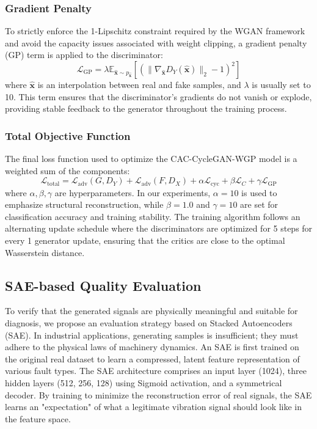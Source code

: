 \subsubsection{Gradient Penalty}
To strictly enforce the 1-Lipschitz constraint required by the WGAN framework and avoid the capacity issues associated with weight clipping, a gradient penalty (GP) term is applied to the discriminator:
\begin{equation}
\mathcal{L}_{\text{GP}} = \lambda \mathbb{E}_{\hat{\boldsymbol{x}} \sim p_{\hat{\boldsymbol{x}}}} [(\|\nabla_{\hat{\boldsymbol{x}}} D_Y(\hat{\boldsymbol{x}})\|_2 - 1)^2]
\end{equation}
where $\hat{\boldsymbol{x}}$ is an interpolation between real and fake samples, and $\lambda$ is usually set to 10. This term ensures that the discriminator's gradients do not vanish or explode, providing stable feedback to the generator throughout the training process.

\subsubsection{Total Objective Function}
The final loss function used to optimize the CAC-CycleGAN-WGP model is a weighted sum of the components:
\begin{equation}
\mathcal{L}_{\text{total}} = \mathcal{L}_{\text{adv}}(G, D_Y) + \mathcal{L}_{\text{adv}}(F, D_X) + \alpha \mathcal{L}_{\text{cyc}} + \beta \mathcal{L}_{C} + \gamma \mathcal{L}_{\text{GP}}
\end{equation}
where $\alpha, \beta, \gamma$ are hyperparameters. In our experiments, $\alpha=10$ is used to emphasize structural reconstruction, while $\beta=1.0$ and $\gamma=10$ are set for classification accuracy and training stability. The training algorithm follows an alternating update schedule where the discriminators are optimized for 5 steps for every 1 generator update, ensuring that the critics are close to the optimal Wasserstein distance.

\subsection{SAE-based Quality Evaluation}
To verify that the generated signals are physically meaningful and suitable for diagnosis, we propose an evaluation strategy based on Stacked Autoencoders (SAE). In industrial applications, generating samples is insufficient; they must adhere to the physical laws of machinery dynamics. An SAE is first trained on the original real dataset to learn a compressed, latent feature representation of various fault types. The SAE architecture comprises an input layer (1024), three hidden layers (512, 256, 128) using Sigmoid activation, and a symmetrical decoder. By training to minimize the reconstruction error of real signals, the SAE learns an "expectation" of what a legitimate vibration signal should look like in the feature space.

